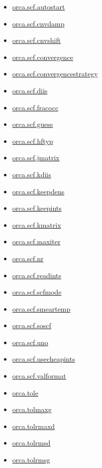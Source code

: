 \documentclass[11pt]{article}
\begin{document}
\begin{itemize}
\item \hyperref[kw:orca-scf-autostart]{orca.scf.autostart}
\item \hyperref[kw:orca-scf-cnvdamp]{orca.scf.cnvdamp}
\item \hyperref[kw:orca-scf-cnvshift]{orca.scf.cnvshift}
\item \hyperref[kw:orca-scf-convergence]{orca.scf.convergence}
\item \hyperref[kw:orca-scf-convergencestrategy]{orca.scf.convergencestrategy}
\item \hyperref[kw:orca-scf-diis]{orca.scf.diis}
\item \hyperref[kw:orca-scf-fracocc]{orca.scf.fracocc}
\item \hyperref[kw:orca-scf-guess]{orca.scf.guess}
\item \hyperref[kw:orca-scf-hftyp]{orca.scf.hftyp}
\item \hyperref[kw:orca-scf-jmatrix]{orca.scf.jmatrix}
\item \hyperref[kw:orca-scf-kdiis]{orca.scf.kdiis}
\item \hyperref[kw:orca-scf-keepdens]{orca.scf.keepdens}
\item \hyperref[kw:orca-scf-keepints]{orca.scf.keepints}
\item \hyperref[kw:orca-scf-kmatrix]{orca.scf.kmatrix}
\item \hyperref[kw:orca-scf-maxiter]{orca.scf.maxiter}
\item \hyperref[kw:orca-scf-nr]{orca.scf.nr}
\item \hyperref[kw:orca-scf-readints]{orca.scf.readints}
\item \hyperref[kw:orca-scf-scfmode]{orca.scf.scfmode}
\item \hyperref[kw:orca-scf-smeartemp]{orca.scf.smeartemp}
\item \hyperref[kw:orca-scf-soscf]{orca.scf.soscf}
\item \hyperref[kw:orca-scf-uno]{orca.scf.uno}
\item \hyperref[kw:orca-scf-usecheapints]{orca.scf.usecheapints}
\item \hyperref[kw:orca-scf-valformat]{orca.scf.valformat}
\item \hyperref[kw:orca-tole]{orca.tole}
\item \hyperref[kw:orca-tolmaxg]{orca.tolmaxg}
\item \hyperref[kw:orca-tolrmaxd]{orca.tolrmaxd}
\item \hyperref[kw:orca-tolrmsd]{orca.tolrmsd}
\item \hyperref[kw:orca-tolrmsg]{orca.tolrmsg}
\end{itemize}
\end{document}
